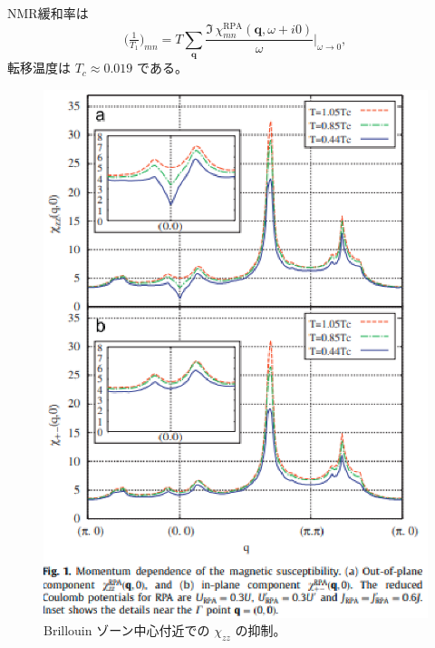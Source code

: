 \documentclass[a4paper,11pt]{jsarticle}
\begin{document}
NMR緩和率は
\begin{equation}
\bigl(\tfrac{1}{T_1}\bigr)_{mn}
= T \sum_{\bm{q}}
\frac{\Im\,\chi^{\mathrm{RPA}}_{mn}(\bm{q},\omega + i0)}{\omega}
\biggr\rvert_{\omega \to 0},
\end{equation}
転移温度は $T_c \approx 0.019$ である。

\begin{figure}[htbp]
  \centering
  \includegraphics[width=\textwidth]{image-17.eps}
  \caption{Brillouin ゾーン中心付近での $\chi_{zz}$ の抑制。}
\end{figure}
\end{document}
